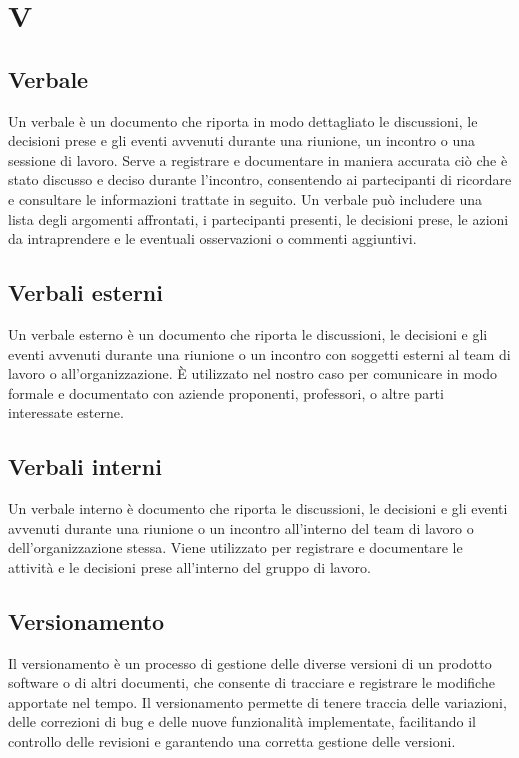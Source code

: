 \section*{V} 
\subsection*{Verbale} 
Un verbale è un documento che riporta in modo dettagliato le discussioni, le decisioni prese e gli eventi avvenuti durante una riunione, un incontro o una sessione di lavoro. Serve a registrare e documentare in maniera accurata ciò che è stato discusso e deciso durante l'incontro, consentendo ai partecipanti di ricordare e consultare le informazioni trattate in seguito. Un verbale può includere una lista degli argomenti affrontati, i partecipanti presenti, le decisioni prese, le azioni da intraprendere e le eventuali osservazioni o commenti aggiuntivi. 
\subsection*{Verbali esterni} 
Un verbale esterno è un documento che riporta le discussioni, le decisioni e gli eventi avvenuti durante una riunione o un incontro con soggetti esterni al team di lavoro o all'organizzazione. È utilizzato nel nostro caso per comunicare in modo formale e documentato con aziende proponenti, professori, o altre parti interessate esterne.
\subsection*{Verbali interni} 
Un verbale interno è documento che riporta le discussioni, le decisioni e gli eventi avvenuti durante una riunione o un incontro all'interno del team di lavoro o dell'organizzazione stessa. Viene utilizzato per registrare e documentare le attività e le decisioni prese all'interno del gruppo di lavoro.
\subsection*{Versionamento} 
Il versionamento è un processo di gestione delle diverse versioni di un prodotto software o di altri documenti, che consente di tracciare e registrare le modifiche apportate nel tempo. Il versionamento permette di tenere traccia delle variazioni, delle correzioni di bug e delle nuove funzionalità implementate, facilitando il controllo delle revisioni e garantendo una corretta gestione delle versioni. 
